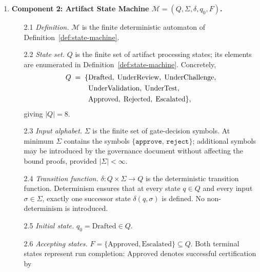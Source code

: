 \documentclass[12pt]{article}
\theoremstyle{definition}
\begin{document}
\begin{enumerate}
  \item \textbf{Component 2: Artifact State Machine
        $\mathcal{M} = (Q,\Sigma,\delta,q_0,F)$.}
  \begin{enumerate}
    \item[2.1] \emph{Definition.}
               $\mathcal{M}$ is the finite deterministic automaton of
               Definition~\ref{def:state-machine}.
    \item[2.2] \emph{State set.}
               $Q$ is the finite set of artifact processing states;
               its elements are enumerated in
               Definition~\ref{def:state-machine}.  Concretely,
               \begin{align}
                 Q \;=\;
                 \{&\mathrm{Drafted},\;
                   \mathrm{UnderReview},\;
                   \mathrm{UnderChallenge},\notag\\
                 &\mathrm{UnderValidation},\;
                   \mathrm{UnderTest},\notag\\
                 &\mathrm{Approved},\;
                   \mathrm{Rejected},\;
                   \mathrm{Escalated}\},
                   \label{eq:Q-def}
               \end{align}
               giving $|Q| = 8$.
    \item[2.3] \emph{Input alphabet.}
               $\Sigma$ is the finite set of gate-decision symbols.
               At minimum $\Sigma$ contains the symbols
               $\{\mathtt{approve},\,\mathtt{reject}\}$;
               additional symbols may be introduced by the governance
               document without affecting the bound proofs, provided
               $|\Sigma| < \infty$.
    \item[2.4] \emph{Transition function.}
               $\delta : Q \times \Sigma \to Q$ is the deterministic
               transition function.  Determinism ensures that at every
               state $q \in Q$ and every input $\sigma \in \Sigma$,
               exactly one successor state $\delta(q,\sigma)$ is
               defined.  No non-determinism is introduced.
    \item[2.5] \emph{Initial state.}
               $q_0 = \mathrm{Drafted} \in Q$.
    \item[2.6] \emph{Accepting states.}
               $F = \{\mathrm{Approved},\mathrm{Escalated}\} \subseteq Q$.
               Both terminal states represent run completion:
               $\mathrm{Approved}$ denotes successful certification by

\end{enumerate}
\end{enumerate}
\end{document}
